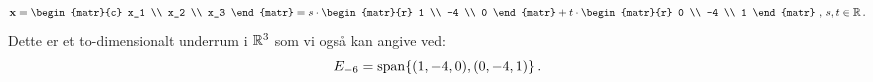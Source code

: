 \begin{example}
\begin{equation}
\mx = \begin{matr}{c} x_1 \\ x_2 \\ x_3 \end{matr} = s \cdot \begin{matr}{r} 1 \\ -4 \\ 0 \end{matr} + t \cdot \begin{matr}{r} 0 \\ -4 \\ 1 \end{matr}\,\,,\,s,t \in \reel\,.
\end{equation}
Dette er et to-dimensionalt underrum i $ \mathbb{R}^3 $ som vi også kan angive ved:
\begin{equation}
E_{-6}=\mathrm{span}\{(1,-4,0),(0,-4,1)\}\,.
\end{equation}


\end{example}
